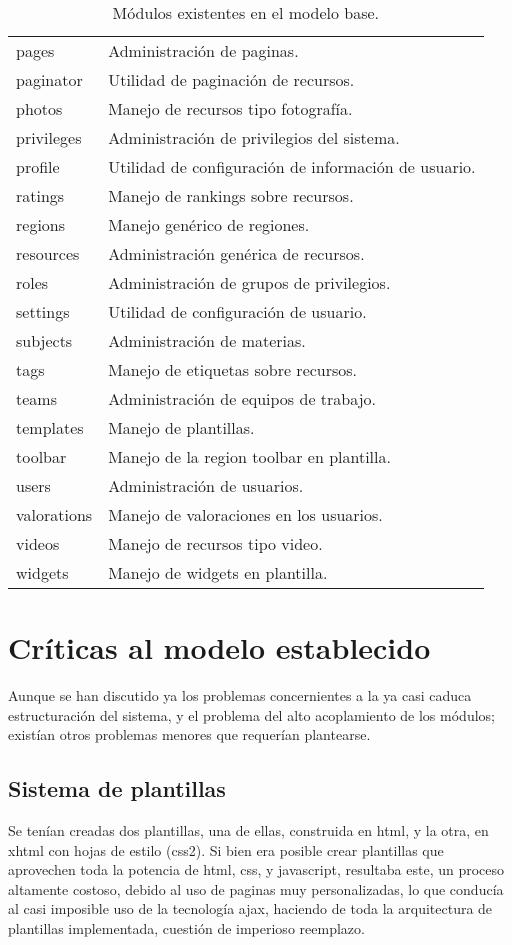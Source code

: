 \begin{table}
\begin{tabular}{l|l}
pages & Administración de paginas. \\
paginator & Utilidad de paginación de recursos. \\
photos & Manejo de recursos tipo fotografía. \\
privileges & Administración de privilegios del sistema. \\
profile & Utilidad de configuración de información de usuario. \\
ratings & Manejo de rankings sobre recursos. \\
regions & Manejo genérico de regiones. \\
resources & Administración genérica de recursos. \\
roles & Administración de grupos de privilegios. \\
settings & Utilidad de configuración de usuario. \\
subjects & Administración de materias. \\
tags & Manejo de etiquetas sobre recursos. \\
teams & Administración de equipos de trabajo. \\
templates & Manejo de plantillas. \\
toolbar & Manejo de la region toolbar en plantilla. \\
users & Administración de usuarios. \\
valorations & Manejo de valoraciones en los usuarios. \\
videos & Manejo de recursos tipo video. \\
widgets & Manejo de widgets en plantilla. \\
\end{tabular}
\caption{Módulos existentes en el modelo base.}
\label{modulos_base}
\end{table}

\section{Críticas al modelo establecido}
Aunque se han discutido ya los problemas concernientes a la ya casi caduca estructuración del sistema, y el problema del
alto acoplamiento de los módulos; existían otros problemas menores que requerían plantearse.

\subsection{Sistema de plantillas}
Se tenían creadas dos plantillas, una de ellas, construida en html, y la otra, en xhtml con hojas de estilo (css2). Si
bien era posible crear plantillas que aprovechen toda la potencia de html, css, y javascript, resultaba este, un proceso
altamente costoso, debido al uso de paginas muy personalizadas, lo que conducía al casi imposible uso de la tecnología
ajax, haciendo de toda la arquitectura de plantillas implementada, cuestión de imperioso reemplazo.

